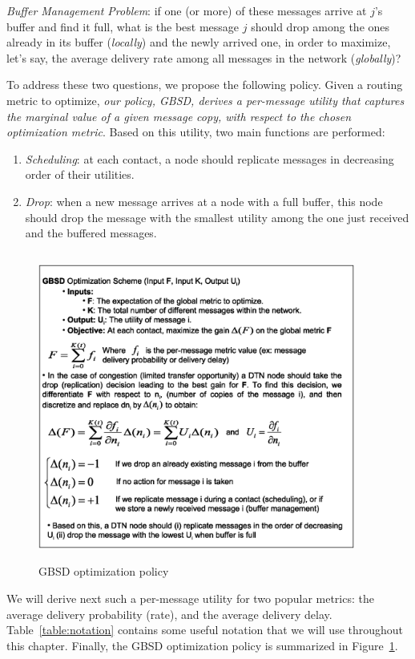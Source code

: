 \emph{Buffer Management Problem}: if one (or more) of these messages arrive at $j$'s buffer and find it full, what is the best message $j$ should drop among the ones already in its buffer (\emph{locally}) and the newly arrived one, in order to maximize, let's say, the average delivery rate among all messages in the network (\emph{globally})?

To address these two questions, we propose the following policy. Given a routing metric to optimize, \emph{our policy, GBSD, derives a per-message utility that captures the \emph{marginal value} of a given message copy, with respect to the chosen optimization metric}. Based on this utility, two main functions are performed:

\begin{enumerate}
\item \emph{Scheduling}: at each contact, a node should replicate messages in decreasing order of their utilities.
\item \emph{Drop}: when a new message arrives at a node with a full buffer, this node should drop the message with the smallest utility among the one just received and the buffered messages.
\end{enumerate}

\begin{figure}[!h]
\centering
\includegraphics[width=4.1in,height=4in]{Chapitre3/GOS.eps}
\caption{GBSD optimization policy}
\label{GlobalOptimizationSchema}
\end{figure}

We will derive next such a per-message utility for two popular metrics: the average delivery probability (rate), and the average delivery delay. Table~\ref{table:notation} contains some useful notation that we will use throughout this chapter. Finally, the GBSD optimization policy is summarized in Figure~\ref{GlobalOptimizationSchema}.

